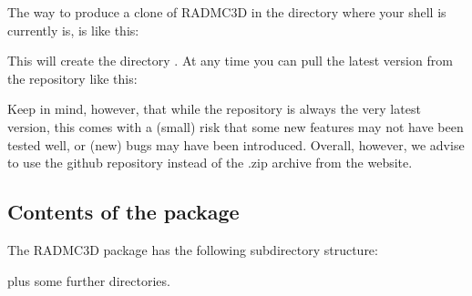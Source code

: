 \documentclass[letterpaper,10pt,english]{sphinxmanual}
\begin{document}
The way to produce a clone of RADMC\sphinxhyphen{}3D in the directory where your
shell is currently is, is like this:

\begin{sphinxVerbatim}[commandchars=\\\{\}]
  
\end{sphinxVerbatim}

This will create the directory . At any time you can
pull the latest version from the repository like this:

\begin{sphinxVerbatim}[commandchars=\\\{\}]
 
 
\end{sphinxVerbatim}

Keep in mind, however, that while the repository is always the very
latest version, this comes with a (small) risk that some new features
may not have been tested well, or (new) bugs may have been introduced.
Overall, however, we advise to use the github repository instead of
the .zip archive from the website.


\subsection{Contents of the package}
\label{\detokenize{overview:contents-of-the-package}}
The RADMC\sphinxhyphen{}3D package has the following subdirectory
structure:

\begin{sphinxVerbatim}[commandchars=\\\{\}]
\end{sphinxVerbatim}

plus some further directories.
\end{document}
